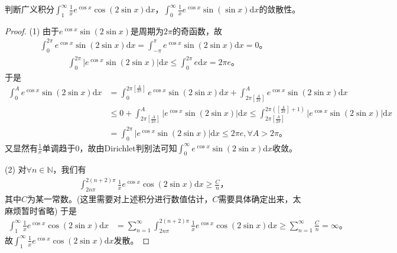 \documentclass[../../main.tex]{subfiles}%
\begin{document}
\begin{example}
判断广义积分\(\int_{1}^{\infty}\frac{1}{x}e^{\cos x}\cos(2\sin x)\mathrm{d}x\)，\(\int_{0}^{\infty}\frac{1}{x}e^{\cos x}\sin(\sin x)\mathrm{d}x\)的敛散性。 
\end{example}
\begin{proof}
(1) 由于\(e^{\cos x}\sin \left( 2\sin x \right)\)是周期为\(2\pi\)的奇函数，故
\begin{align*}
\int_0^{2\pi}{e^{\cos x}\sin \left( 2\sin x \right) \mathrm{d}x}=\int_{-\pi}^{\pi}{e^{\cos x}\sin \left( 2\sin x \right) \mathrm{d}x}=0。
\end{align*}
\begin{align*}
\int_0^{2\pi}{\left| e^{\cos x}\sin \left( 2\sin x \right) \right|\mathrm{d}x}\leqslant \int_0^{2\pi}{e\mathrm{d}x}=2\pi e。
\end{align*}
于是
\begin{align*}
\int_0^A{e^{\cos x}\sin \left( 2\sin x \right) \mathrm{d}x}&=\int_0^{2\pi \left[ \frac{A}{2\pi} \right]}{e^{\cos x}\sin \left( 2\sin x \right) \mathrm{d}x}+\int_{2\pi \left[ \frac{A}{2\pi} \right]}^A{e^{\cos x}\sin \left( 2\sin x \right) \mathrm{d}x} \\
&\leqslant 0+\int_{2\pi \left[ \frac{A}{2\pi} \right]}^A{\left| e^{\cos x}\sin \left( 2\sin x \right) \right|\mathrm{d}x} 
\leqslant \int_{2\pi \left[ \frac{A}{2\pi} \right]}^{2\pi \left( \left[ \frac{A}{2\pi} \right] +1 \right)}{\left| e^{\cos x}\sin \left( 2\sin x \right) \right|\mathrm{d}x} \\
&=\int_0^{2\pi}{\left| e^{\cos x}\sin \left( 2\sin x \right) \right|\mathrm{d}x}\leqslant 2\pi e,\forall A>2\pi。
\end{align*}
又显然有\(\frac{1}{x}\)单调趋于\(0\)，故由Dirichlet判别法可知\(\int_0^{\infty}{e^{\cos x}\sin \left( 2\sin x \right) \mathrm{d}x}\)收敛。

(2) 对\(\forall n\in \mathbb{N}\)，我们有
\begin{align*}
\int_{2n\pi}^{2\left( n+2 \right) \pi}{\frac{1}{x}e^{\cos x}\cos \left( 2\sin x \right) \mathrm{d}x}\geqslant \frac{C}{n}，
\end{align*}
其中\(C\)为某一常数。(这里需要对上述积分进行数值估计，\(C\)需要具体确定出来，太麻烦暂时省略) 于是
\begin{align*}
\int_1^{\infty}{\frac{1}{x}e^{\cos x}\cos(2\sin x)\mathrm{d}x}&=\sum_{n=1}^{\infty}{\int_{2n\pi}^{2\left( n+2 \right) \pi}{\frac{1}{x}e^{\cos x}\cos \left( 2\sin x \right) \mathrm{d}x}} 
\geqslant \sum_{n=1}^{\infty}{\frac{C}{n}}=\infty。
\end{align*}
故\(\int_1^{\infty}{\frac{1}{x}e^{\cos x}\cos(2\sin x)\mathrm{d}x}\)发散。
\end{proof}
\end{document}
